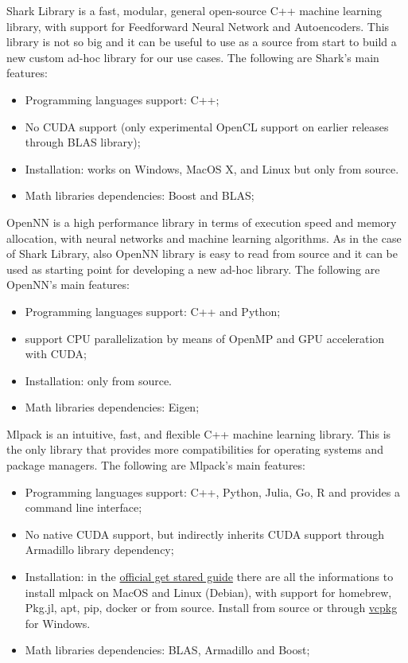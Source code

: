 Shark Library is a fast, modular, general open-source C++ machine learning library, with support for Feedforward Neural Network and Autoencoders. This library is not so big and it can be useful to use as a source from start to build a new custom ad-hoc library for our use cases. The following are Shark's main features: 
\begin{itemize}
	\item Programming languages support: C++; 
	\item No CUDA support (only experimental OpenCL support on earlier releases through BLAS library);
	\item Installation: works on Windows, MacOS X, and Linux but only from source.
	\item Math libraries dependencies: Boost and BLAS;
\end{itemize}

OpenNN is a high performance library in terms of execution speed and memory allocation, with neural networks and machine learning algorithms. As in the case of Shark Library, also OpenNN library is easy to read from source and it can be used as starting point for developing a new ad-hoc library. The following are OpenNN's main features: 
\begin{itemize}
	\item Programming languages support: C++ and Python; 
	\item support CPU parallelization by means of OpenMP and GPU acceleration with CUDA;
	\item Installation: only from source.
	\item Math libraries dependencies: Eigen;
\end{itemize}

Mlpack is an intuitive, fast, and flexible C++ machine learning library. This is the only library that provides more compatibilities for operating systems and package managers. The following are Mlpack's main features: 
\begin{itemize}
	\item Programming languages support: C++, Python, Julia, Go, R and provides a command line interface; 
	\item No native CUDA support, but indirectly inherits CUDA support through Armadillo library dependency;
	\item Installation: in the \href{https://www.mlpack.org/getstarted.html}{official get stared guide} there are all the informations to install mlpack on MacOS and Linux (Debian), with support for homebrew, Pkg.jl, apt, pip, docker or from source. Install from source or through \href{https://www.mlpack.org/doc/mlpack-3.4.2/doxygen/build_windows.html}{vcpkg} for Windows. 
	\item Math libraries dependencies: BLAS, Armadillo and Boost;
\end{itemize}

